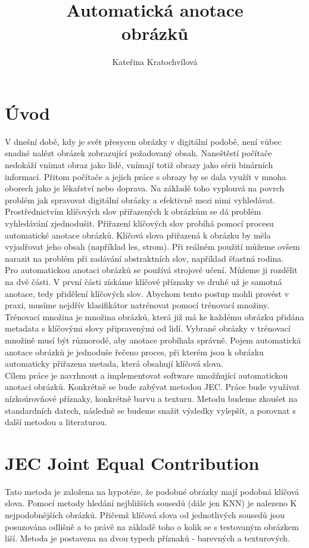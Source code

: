 \documentclass[czech,BP]{thesiskiv}
\author{Kateřina Kratochvílová}
\title{Automatická anotace\\obrázků}
\begin{document}
%
\maketitle
\tableofcontents


\chapter{Úvod}
V dnešní době, kdy je svět přesycen obrázky v digitální podobě, není vůbec snadné nalézt obrázek zobrazující požadovaný obsah. Naneštěstí počítače nedokáží vnímat obraz jako lidé, vnímají totiž obrazy jako sérii binárních informací. Přitom počítače a jejich práce s obrazy by se dala využít v mnoha oborech jako je lékařství nebo doprava. Na základě toho vyplouvá na povrch problém jak spravovat digitální obrázky a efektivně mezi nimi vyhledávat. Prostřednictvím klíčových slov přiřazených k obrázkům se dá problém vyhledávání zjednodušit. Přiřazení klíčových slov probíhá pomocí procesu automatické anotace obrázků. Klíčová slova přiřazená k obrázku by měla vyjadřovat jeho obsah (například les, strom). Při reálném použití můžeme ovšem narazit na problém při zadávání abstraktních slov, například šťastná rodina.  
\\
Pro automatickou anotaci obrázků se používá strojové učení. Můžeme ji rozdělit na dvě části. V první části získáme klíčové příznaky ve druhé už je samotná anotace, tedy přidělení klíčových slov. Abychom tento postup mohli provést v praxi, musíme nejdřív klasifikátor natrénovat pomocí trénovací množiny. Trénovací množina je množina obrázků, která již má ke každému obrázku přidána metadata s klíčovými slovy připravenými od lidí. Vybrané obrázky v trénovací množině musí být různorodé, aby anotace probíhala správně. Pojem automatická anotace obrázků je jednoduše řečeno proces, při kterém jsou k obrázku automaticky přiřazena metada, která obsahují klíčová slova. 
\\
Cílem práce je navrhnout a implementovat software umožňující automatickou anotaci obrázků. Konkrétně se bude zabývat metodou JEC. Práce bude využívat nízkoúrovňové příznaky, konkrétně barvu a texturu. Metodu budeme zkoušet na standardních datech, následně se budeme snažit výsledky vylepšít, a porovnat s další metodou a literaturou.


\chapter{JEC Joint Equal Contribution}
Tato metoda je založena na hypotéze, že podobné obrázky mají podobná klíčová slova. Pomocí metody hledání nejbližších sousedů (dále jen KNN) je nalezeno K nejpodobnějších obrázků. Přičemž klíčová slova od jednotlivých sousedů jsou posuzována odlišně a to právě na základě toho o kolik se s testovaným obrázkem liší. Metoda je postavena na dvou typech příznaků - barevných a texturových. 
\cite{JEC}
\end{document}
